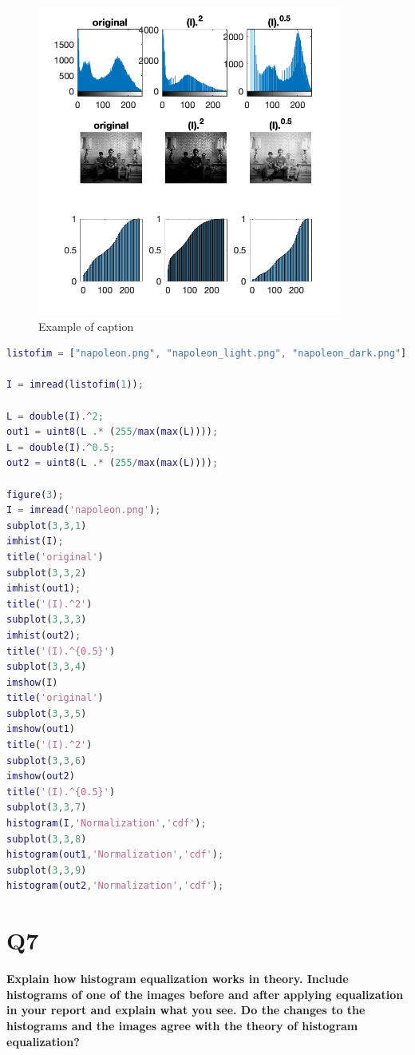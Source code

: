 \documentclass[oneside,a4paper]{article}
\begin{document}
\begin{figure}[ht!]
\centering
\includegraphics[width=100mm]{figures/Q6.png}
\caption{Example of caption}
\label{fig:Q6}
\end{figure}

\begin{lstlisting}[language=MATLAB]
listofim = ["napoleon.png", "napoleon_light.png", "napoleon_dark.png"];

I = imread(listofim(1));

L = double(I).^2;
out1 = uint8(L .* (255/max(max(L)))); 
L = double(I).^0.5;
out2 = uint8(L .* (255/max(max(L)))); 

figure(3);
I = imread('napoleon.png'); 
subplot(3,3,1)
imhist(I);
title('original')
subplot(3,3,2)
imhist(out1);
title('(I).^2')
subplot(3,3,3)
imhist(out2);
title('(I).^{0.5}')
subplot(3,3,4)
imshow(I)
title('original')
subplot(3,3,5)
imshow(out1)
title('(I).^2')
subplot(3,3,6)
imshow(out2)
title('(I).^{0.5}')
subplot(3,3,7)
histogram(I,'Normalization','cdf');
subplot(3,3,8)
histogram(out1,'Normalization','cdf');
subplot(3,3,9)
histogram(out2,'Normalization','cdf');
\end{lstlisting}


\section*{Q7}
\textbf{Explain how histogram equalization works in theory. Include histograms of one of the images before and after applying equalization in your report and explain what you see. Do the changes to the histograms and the images agree with the theory of histogram equalization?}
\end{document}
